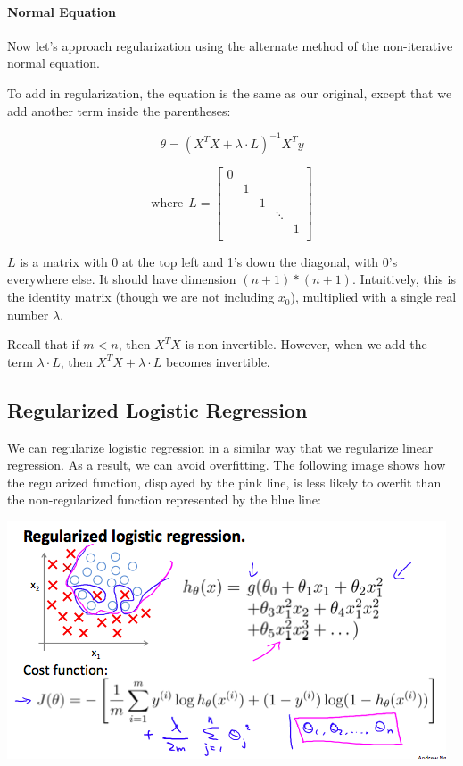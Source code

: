 \documentclass[UTF8]{article}
\begin{document}
\paragraph{Normal Equation}

Now let's approach regularization using the alternate method of the non-iterative normal equation.

To add in regularization, the equation is the same as our original, except that we add another term inside the parentheses:

\[ \theta = \left( X^TX + \lambda \cdot L \right)^{-1} X^Ty \]

\[ \text{where}\ \ L = \begin{bmatrix} 0 & & & & \\ & 1 & & & \\ & & 1 & & \\ & & & \ddots & \\ & & & & 1 \\\end{bmatrix}\]

$L$ is a matrix with 0 at the top left and 1's down the diagonal, with 0's everywhere else. It should have dimension $(n+1)*(n+1)$. Intuitively, this is the identity matrix (though we are not including $x_0$), multiplied with a single real number $\lambda$.

Recall that if $m < n$, then $X^TX$ is non-invertible. However, when we add the term $\lambda \cdot L$, then $X^TX + \lambda \cdot L$ becomes invertible.

\subsection{Regularized Logistic Regression}

We can regularize logistic regression in a similar way that we regularize linear regression. As a result, we can avoid overfitting. The following image shows how the regularized function, displayed by the pink line, is less likely to overfit than the non-regularized function represented by the blue line:

\includegraphics[width = \textwidth]{NotePics/7_4_1.png}
\end{document}
